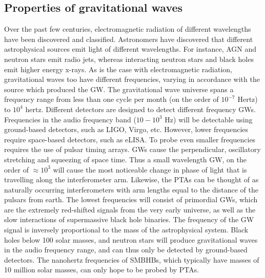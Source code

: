 \documentclass[12pt]{article}
\begin{document}
	\subsection{Properties of gravitational waves}
	Over the past few centuries, electromagnetic radiation of different wavelengths have been discovered and classified. Astronomers have discovered that different astrophysical sources emit light of different wavelengths. For instance, AGN and neutron stars emit radio jets, whereas interacting neutron stars and black holes emit higher energy x-rays. 
	As is the case with electromagnetic radiation, gravitational waves too have different frequencies, varying in accordance with the source which produced the GW. The gravitational wave universe spans a frequency range from less than one cycle per month (on the order of $10^{-7}$ Hertz) to $10^4$ hertz. Different detectors are designed to detect different frequency GWs. Frequencies in the audio frequency band ($10-10^3$ Hz) will be detectable using ground-based detectors, such as LIGO, Virgo, etc.  However, lower frequencies require space-based detectors, such as eLISA. To probe even smaller frequencies requires the use of pulsar timing arrays. GWs cause the perpendicular, oscillatory stretching and squeezing of space time. Thus a small wavelength GW, on the order of $\approx 10^3$ will cause the most noticeable change in phase of light that is travelling along the interferometer arm. Likewise, the PTAs can be thought of as naturally occurring interferometers with arm lengths equal to the distance of the pulsars from earth. The lowest frequencies will consist of primordial GWs, which are the extremely red-shifted signals from the very early universe, as well as the slow interactions of supermassive black hole binaries. The frequency of the GW signal is inversely proportional to the mass of the astrophysical system. Black holes below 100 solar masses, and neutron stars will produce gravitational waves in the audio frequency range, and can thus only be detected by ground-based detectors. The nanohertz frequencies of SMBHBs, which typically have masses of 10 million solar masses, can only hope to be probed by PTAs.\\
	
\end{document}
